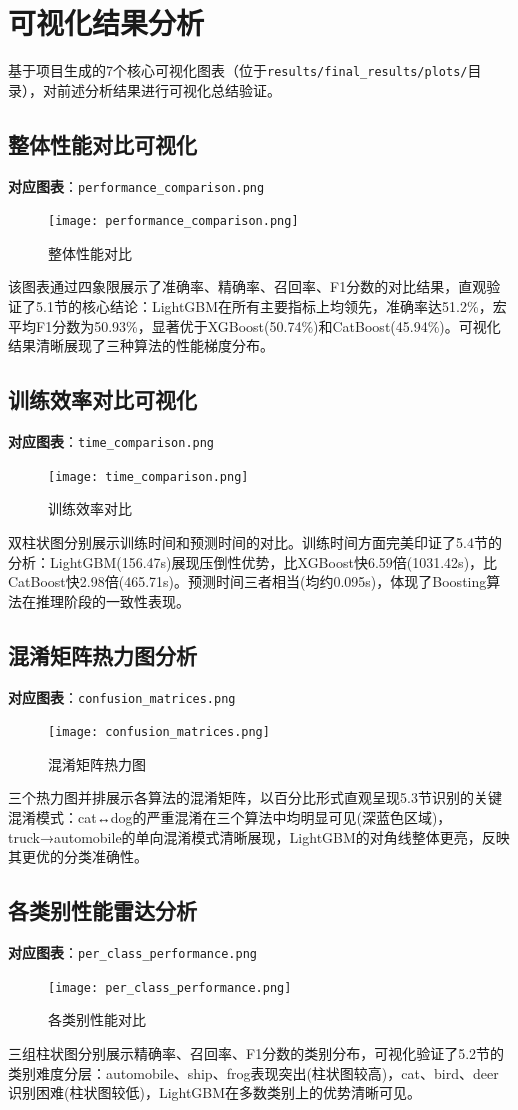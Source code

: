 \documentclass[UTF8]{report}
\theoremstyle{MyLineTheoremStyle} %
\theoremstyle{MyBlockTheoremStyle} %
\theoremstyle{MySubsubsectionStyle} %
\begin{document}
\section{可视化结果分析}
基于项目生成的7个核心可视化图表（位于\texttt{results/final\_results/plots/}目录），对前述分析结果进行可视化总结验证。

\subsection{整体性能对比可视化}
\textbf{对应图表}：\texttt{performance\_comparison.png}
\begin{figure}[H]
    \centering
    \texttt{[image: performance\_comparison.png]}
    \caption{整体性能对比}
\end{figure}
该图表通过四象限展示了准确率、精确率、召回率、F1分数的对比结果，直观验证了5.1节的核心结论：LightGBM在所有主要指标上均领先，准确率达51.2\%，宏平均F1分数为50.93\%，显著优于XGBoost(50.74\%)和CatBoost(45.94\%)。可视化结果清晰展现了三种算法的性能梯度分布。

\subsection{训练效率对比可视化}
\textbf{对应图表}：\texttt{time\_comparison.png}
\begin{figure}[H]
    \centering
    \texttt{[image: time\_comparison.png]}
    \caption{训练效率对比}
\end{figure}
双柱状图分别展示训练时间和预测时间的对比。训练时间方面完美印证了5.4节的分析：LightGBM(156.47s)展现压倒性优势，比XGBoost快6.59倍(1031.42s)，比CatBoost快2.98倍(465.71s)。预测时间三者相当(均约0.095s)，体现了Boosting算法在推理阶段的一致性表现。

\subsection{混淆矩阵热力图分析}
\textbf{对应图表}：\texttt{confusion\_matrices.png}
\begin{figure}[H]
    \centering
    \texttt{[image: confusion\_matrices.png]}
    \caption{混淆矩阵热力图}
\end{figure}
三个热力图并排展示各算法的混淆矩阵，以百分比形式直观呈现5.3节识别的关键混淆模式：cat↔dog的严重混淆在三个算法中均明显可见(深蓝色区域)，truck→automobile的单向混淆模式清晰展现，LightGBM的对角线整体更亮，反映其更优的分类准确性。

\subsection{各类别性能雷达分析}
\textbf{对应图表}：\texttt{per\_class\_performance.png}
\begin{figure}[H]
    \centering
    \texttt{[image: per\_class\_performance.png]}
    \caption{各类别性能对比}
\end{figure}
三组柱状图分别展示精确率、召回率、F1分数的类别分布，可视化验证了5.2节的类别难度分层：automobile、ship、frog表现突出(柱状图较高)，cat、bird、deer识别困难(柱状图较低)，LightGBM在多数类别上的优势清晰可见。
\end{document}
